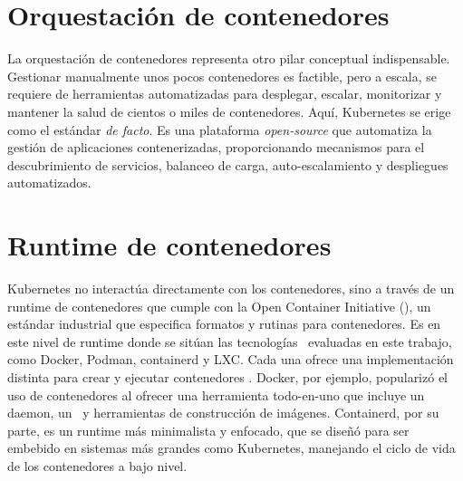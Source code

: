 \section{Orquestación de contenedores}
La orquestación de contenedores representa otro pilar conceptual indispensable. Gestionar manualmente unos pocos contenedores es factible, pero a escala, se requiere de herramientas automatizadas para desplegar, escalar, monitorizar y mantener la salud de cientos o miles de contenedores. Aquí, Kubernetes se erige como el estándar \textit{de facto}. Es una plataforma \textit{open-source} que automatiza la gestión de aplicaciones contenerizadas, proporcionando mecanismos para el descubrimiento de servicios, balanceo de carga, auto-escalamiento y despliegues automatizados. 

\section{Runtime de contenedores}
Kubernetes no interactúa directamente con los contenedores, sino a través de un runtime de contenedores que cumple con la Open Container Initiative (\OCI), un estándar industrial que especifica formatos y rutinas para contenedores. Es en este nivel de runtime donde se sitúan las tecnologías \VBC\ evaluadas en este trabajo, como Docker, Podman, containerd y LXC. Cada una ofrece una implementación distinta para crear y ejecutar contenedores \OCI. Docker, por ejemplo, popularizó el uso de contenedores al ofrecer una herramienta todo-en-uno que incluye un daemon, un \CLI\ y herramientas de construcción de imágenes. Containerd, por su parte, es un runtime más minimalista y enfocado, que se diseñó para ser embebido en sistemas más grandes como Kubernetes, manejando el ciclo de vida de los contenedores a bajo nivel. 

